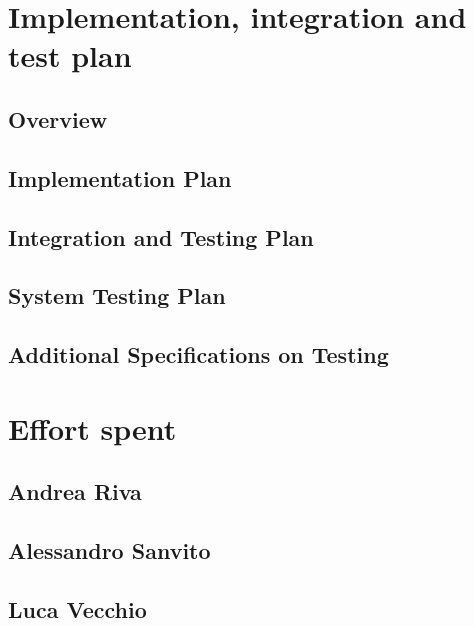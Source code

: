 \documentclass[10pt,english, openany]{book}
\begin{document}


\chapter{Implementation, integration and test plan}

\section{Overview}



\section{Implementation Plan}



\section{Integration and Testing Plan}



\section{System Testing Plan}



\section{Additional Specifications on Testing}



\chapter{Effort spent}

\section{Andrea Riva}



\section{Alessandro Sanvito}



\section{Luca Vecchio}



\pagebreak
\end{document}
